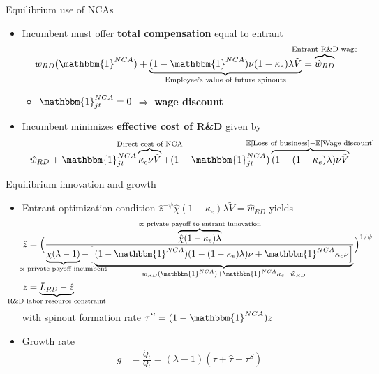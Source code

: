 \documentclass[english,usenames,dvipsnames,handout]{beamer}
\begin{document}
\begin{frame}{Equilibrium use of NCAs}\label{use_of_ncas_details}
	\hyperlink{use_of_ncas}{}
	\begin{itemize}
		\item Incumbent must offer \alert{\textbf{total compensation}} equal to entrant
		\begin{align*}
		w_{RD}(\mathbbm{1}^{NCA}) + \underbrace{(1-\mathbbm{1}^{NCA}) \nu (1-\kappa_e) \lambda \tilde{V}}_{\mathclap{\text{Employee's value of future spinouts}}} &= \overbrace{\hat{w}_{RD}}^{\mathclap{\text{Entrant R\&D wage}}} 
		\end{align*}
		\begin{itemize}
			\item $\mathbbm{1}^{NCA}_{jt} = 0$ $\Rightarrow$ \alert{\textbf{wage discount}}
		\end{itemize}
		\item Incumbent minimizes \alert{\textbf{effective cost of R\&D}} given by
		\begin{align*}
		\hat{w}_{RD} + \mathbbm{1}^{NCA}_{jt} \overbrace{ \kappa_c \nu \tilde{V}}^{\mathclap{\text{Direct cost of NCA}}} + (1- \mathbbm{1}^{NCA}_{jt}) \overbrace{(1 - (1-\kappa_e) \lambda) \nu \tilde{V}}^{\mathclap{\mathbb{E}[\text{Loss of business}] - \mathbb{E}[\text{Wage discount}]}} 
		\end{align*}
	\end{itemize}
\end{frame}

\begin{frame}{Equilibrium innovation and growth}\label{eq_innovation_and_growth}
	\hyperlink{closing_the_model}{} 
	\begin{itemize}
		\item Entrant optimization condition $\hat{z}^{-\psi} \hat{\chi} (1-\kappa_e) \lambda \tilde{V}= \hat{w}_{RD}$ yields
		\begin{align*}
		\hat{z} &= \Big( \frac{ \overbrace{\hat{\chi} (1-\kappa_e) \lambda}^{\mathclap{\propto \text{ private payoff to entrant innovation}}}}{\underbrace{\chi(\lambda -1)}_{\mathclap{\propto \text{ private payoff incumbent}}} - \Big[\underbrace{(1-\mathbbm{1}^{NCA}) (1- (1-\kappa_e) \lambda)\nu + \mathbbm{1}^{NCA} \kappa_c \nu \Big]}_{\mathclap{w_{RD}(\mathbbm{1}^{NCA}) + \mathbbm{1}^{NCA} \kappa_c  - \hat{w}_{RD}}} }\Big)^{1/\psi} \\
		z &= \underbrace{\bar{L}_{RD} - \hat{z}}_{\mathclap{\text{R\&D labor resource constraint}}} 
		\end{align*}
		with spinout formation rate $\tau^S = (1-\mathbbm{1}^{NCA}) z$
		\item Growth rate
		\begin{align*}
		g &= \frac{\dot{Q}_t}{Q_t} = (\lambda - 1) (\tau + \hat{\tau} + \tau^S)
		\end{align*}
	\end{itemize}
\end{frame}
\end{document}
